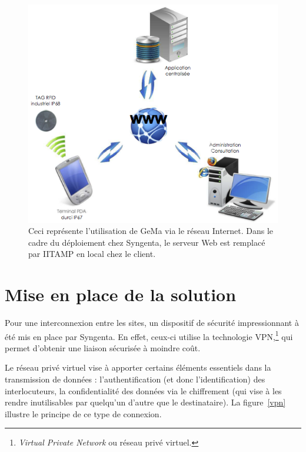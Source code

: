 \begin{figure}
  \begin{center}
    \includegraphics[scale=1.5]{images/gema.png}
    \caption{Ceci représente l'utilisation de GeMa via le réseau
    Internet. Dans le cadre du déploiement chez Syngenta, le serveur Web
    est remplacé par IITAMP en local chez le client.}
    \label{gema}
  \end{center}
\end{figure}

\section{Mise en place de la solution} %
\label{sec:Mise en place de la solution}

Pour une interconnexion entre les sites, un dispositif de sécurité
impressionnant à été mis en place par Syngenta. En effet, ceux-ci
utilise la technologie VPN,\footnote{\emph{Virtual Private Network} ou
réseau privé virtuel.} qui permet d'obtenir une liaison sécurisée à
moindre coût.

Le réseau privé virtuel vise à apporter certains éléments essentiels
dans la transmission de données : l'authentification (et donc
l'identification) des interlocuteurs, la confidentialité des données via
le chiffrement (qui vise à les rendre inutilisables par quelqu'un
d'autre que le destinataire). La figure~\ref{vpn} illustre le principe
de ce type de connexion.

